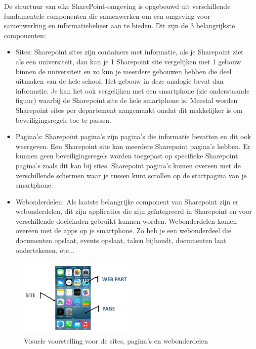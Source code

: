 De structuur van elke SharePoint-omgeving is opgebouwd uit verschillende fundamentele componenten die samenwerken om een omgeving voor samenwerking en informatiebeheer aan te bieden. Dit zijn de 3 belangrijkste componenten:
\begin{itemize}
    \item Sites: Sharepoint sites zijn containers met informatie, als je Sharepoint ziet als een universiteit, dan kan je 1 Sharepoint site vergelijken met 1 gebouw binnen de universiteit en zo kun je meerdere gebouwen hebben die deel uitmaken van de hele school. Het gebouw in deze analogie bevat dan informatie. Je kan het ook vergelijken met een smartphone (zie onderstaande figuur) waarbij de Sharepoint site de hele smartphone is. Meestal worden Sharepoint sites per departement aangemaakt omdat dit makkelijker is om beveiligingsregels toe te passen. \autocite{Zelfond2016}
    \item Pagina's: Sharepoint pagina's zijn pagina's die informatie bevatten en dit ook weergeven. Een Sharepoint site kan meerdere Sharepoint pagina's hebben. Er kunnen geen beveiligingsregels worden toegepast op specifieke Sharepoint pagina's zoals dit kan bij sites. Sharepoint pagina's komen overeen met de verschillende schermen waar je tussen kunt scrollen op de startpagina van je smartphone. \autocite{Zelfond2016}
    \item Webonderdelen: Als laatste belangrijke component van Sharepoint zijn er webonderdelen, dit zijn applicaties die zijn geïntegreerd in Sharepoint en voor verschillende doeleinden gebruikt kunnen worden. Webonderdelen komen overeen met de apps op je smartphone. Zo heb je een webonderdeel die documenten opslaat, events opslaat, taken bijhoudt, documenten laat ondertekenen, etc...\autocite{Zelfond2016}
\end{itemize}
\begin{figure}[h] 
    \includegraphics[width=0.5\textwidth]{comps.png} %
    \caption{Visuele voorstelling voor de sites, pagina's en webonderdelen \autocite{Zelfond2016} } %
    \label{fig:your_label} %
\end{figure}

